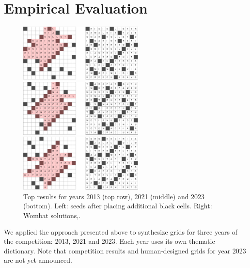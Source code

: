 \section{Empirical Evaluation}


\begin{figure}[th]
\centering
\includegraphics[width=0.56\textwidth]{_empiricalSupport/y-2013/results/_runWombat/mrmeGrids_y2013-60x932-14400x352-14113466-paper.pdf}

\vspace{0.15cm}

\includegraphics[width=0.56\textwidth]{_empiricalSupport/y-2021/results/_runWombat/mrmeGrids_feb3-60x38035-14400x224-13741779-paper.pdf}

\vspace{0.15cm}

\includegraphics[width=0.56\textwidth]{_empiricalSupport/y-2023/results/_runWombat/mrmeGrids_y2023-60x446-14400x352-14179462-paper.pdf}

\caption{Top results for years 2013 (top row), 2021 (middle) and 2023 (bottom). Left: seeds after
placing additional black cells. Right: {\sc Wombat} solutions,.}
\label{fig:results}
\end{figure}

We applied the approach presented above to synthesize grids for three years of the competition: 2013, 2021 and 2023. Each year uses its own thematic dictionary. Note that competition results and human-designed grids for year 2023 are not yet announced.

